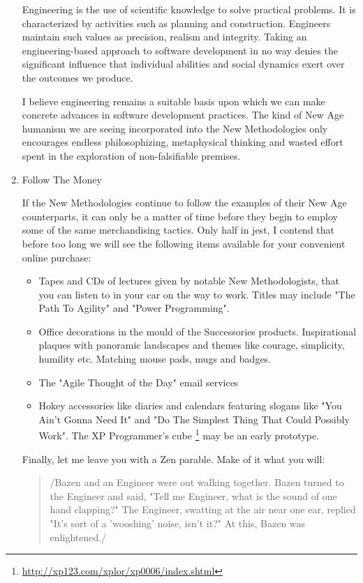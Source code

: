 \documentclass{article}
\begin{document}
\begin{enumerate}
Engineering is the use of scientific knowledge to solve practical
problems. It is characterized by activities such as planning and
construction. Engineers maintain such values as precision, realism and
integrity. Taking an engineering-based approach to software development
in no way denies the significant influence that individual abilities and
social dynamics exert over the outcomes we produce.

I believe engineering remains a suitable basis upon which we can make
concrete advances in software development practices. The kind of New Age
humanism we are seeing incorporated into the New Methodologies only
encourages endless philosophizing, metaphysical thinking and wasted
effort spent in the exploration of non-falsifiable premises.

\item Follow The Money
\label{sec:orgheadline203}

If the New Methodologies continue to follow the examples of their New
Age counterparts, it can only be a matter of time before they begin to
employ some of the same merchandising tactics. Only half in jest, I
contend that before too long we will see the following items available
for your convenient online purchase:

\begin{itemize}
\item Tapes and CDs of lectures given by notable New Methodologists, that
you can listen to in your car on the way to work. Titles may include
"The Path To Agility" and "Power Programming".\\
\item Office decorations in the mould of the Successories products.
Inspirational plaques with panoramic landscapes and themes like
courage, simplicity, humility etc. Matching mouse pads, mugs and
badges.\\
\item The "Agile Thought of the Day" email services
\item Hokey accessories like diaries and calendars featuring slogans like
"You Ain't Gonna Need It" and "Do The Simplest Thing That Could
Possibly Work". The XP Programmer's cube \footnote{\url{http://xp123.com/xplor/xp0006/index.shtml}} may be an early
prototype.
\end{itemize}

Finally, let me leave you with a Zen parable. Make of it what you will:

\begin{quote}
/Bazen and an Engineer were out walking together. Bazen turned to the
Engineer and said, "Tell me Engineer, what is the sound of one hand
clapping?" The Engineer, swatting at the air near one ear, replied
"It's sort of a 'wooshing' noise, isn't it?" At this, Bazen was
enlightened./
\end{quote}
\end{enumerate}
\end{document}
